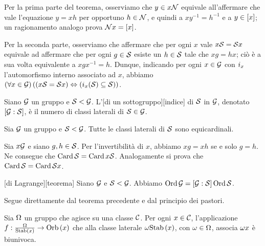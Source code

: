 \Proof Per la prima parte del teorema, osserviamo che $y \in x\mathcal{N}$ equivale all'affermare che vale l'equazione $y = xh$ per opportuno $h \in \mathcal{N}$, e quindi a $xy^{-1} = h^{-1}$ e a $y \in \EquivalenceClass{x}$; un ragionamento analogo prova $\RightCoset{\NormalSubgroup}{x} = \EquivalenceClass{x}$.
\par Per la seconda parte, osserviamo che affermare che per ogni $x$ vale $x\mathcal{S} = \mathcal{S} x$ equivale ad affermare che per ogni $g \in \mathcal{S}$ esiste un $h \in \mathcal{S}$ tale che $xg = hx$; ci\`o \`e a sua volta equivalente a $xgx^{-1} = h$. Dunque, indicando per ogni $x \in \mathcal{G}$ con $\InnerAutomorphism[x]$ l'automorfismo interno associato ad $x$, abbiamo $\ForAll{x \in \Group}{\Coimplies{x\Subgroup = \Subgroup x}{\InnerAutomorphism[x](\Subgroup) \subseteq \Subgroup}}$. \EndProof
\begin{Definition}
	Siano $\mathcal{G}$ un gruppo e $\mathcal{S} < \mathcal{G}$. L'[di un sottogruppo][indice] di $\mathcal{S}$ in $\mathcal{G}$, denotato $[\mathcal{G}:\mathcal{S}]$, \`e il numero di classi laterali di $\mathcal{S} \in \mathcal{G}$.
\end{Definition}
\begin{Theorem}
	Sia $\mathcal{G}$ un gruppo e $\mathcal{S} < \mathcal{G}$. Tutte le classi laterali di $\mathcal{S}$ sono equicardinali.
\end{Theorem}
\Proof Sia $x \mathcal{G}$ e siano $g, h \in \mathcal{S}$. Per l'invertibilit\`a di $x$, abbiamo $xg = xh$ se e solo $g = h$. Ne consegue che $\operatorname{Card}{\mathcal{S}} = \operatorname{Card}{x\mathcal{S}}$. Analogamente si prova che $\operatorname{Card}{\mathcal{S}} = \operatorname{Card}{\mathcal{S} x}$. \EndProof
\begin{Corollary}
	[di Lagrange][teorema] Siano $\mathcal{G}$ e $\mathcal{S} < \mathcal{G}$. Abbiamo $\operatorname{\operatorname{Ord}}{\mathcal{G}} = [\mathcal{G}:\mathcal{S}]\operatorname{\operatorname{Ord}}{\mathcal{S}}$.
\end{Corollary}
\Proof Segue direttamente dal teorema precedente e dal principio dei pastori. \EndProof
\begin{Theorem}
	Sia $\Omega$ un gruppo che agisce su una classe $\mathcal{C}$. Per ogni $x \in \mathcal{C}$, l'applicazione $f: \Quotient{\Operators}{\Stabilizer{x}} \rightarrow \Orbit{x}$ che alla classe laterale $\Coset{\Operator}{\Stabilizer{x}}$, con $\omega \in \Omega$, associa $\omega x$ \`e biunivoca.
\end{Theorem}
